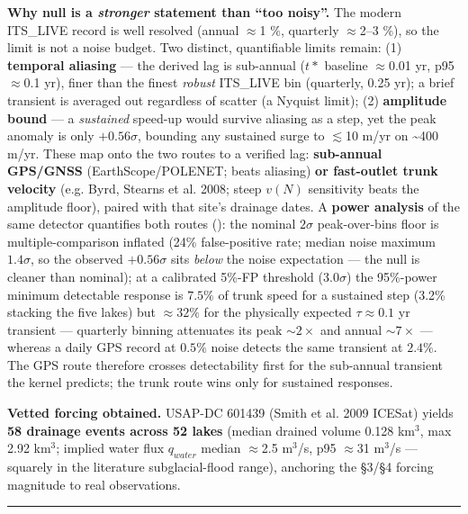 \documentclass[11pt]{article}
\begin{document}
\textbf{Why null is a \emph{stronger} statement than ``too noisy''.} The modern ITS\_LIVE record is well resolved (annual \ensuremath{\approx}1 \%, quarterly \ensuremath{\approx}2–3 \%), so the limit is not a noise budget. Two distinct, quantifiable limits remain: (1) \textbf{temporal aliasing} — the derived lag is sub-annual ($t*$ baseline \ensuremath{\approx}0.01 yr, p95 \ensuremath{\approx}0.1 yr), finer than the finest \emph{robust} ITS\_LIVE bin (quarterly, 0.25 yr); a brief transient is averaged out regardless of scatter (a Nyquist limit); (2) \textbf{amplitude bound} — a \emph{sustained} speed-up would survive aliasing as a step, yet the peak anomaly is only $+0.56\sigma $, bounding any sustained surge to \ensuremath{\lesssim}10 m/yr on \textasciitilde{}400 m/yr. These map onto the two routes to a verified lag: \textbf{sub-annual GPS/GNSS} (EarthScope/POLENET; beats aliasing) \textbf{or fast-outlet trunk velocity} (e.g. Byrd, Stearns et al. 2008; steep $v(N)$ sensitivity beats the amplitude floor), paired with that site's drainage dates. A \textbf{power analysis} of the same detector quantifies both routes (): the nominal $2\sigma $ peak-over-bins floor is multiple-comparison inflated (24\% false-positive rate; median noise maximum $1.4\sigma $, so the observed $+0.56\sigma $ sits \emph{below} the noise expectation — the null is cleaner than nominal); at a calibrated 5\%-FP threshold ($3.0\sigma $) the 95\%-power minimum detectable response is $7.5\%$ of trunk speed for a sustained step (3.2\% stacking the five lakes) but $\approx 32\%$ for the physically expected $\tau \approx 0.1$ yr transient — quarterly binning attenuates its peak $\sim 2\times $ and annual $\sim 7\times $ — whereas a daily GPS record at $0.5\%$ noise detects the same transient at $2.4\%$. The GPS route therefore crosses detectability first for the sub-annual transient the kernel predicts; the trunk route wins only for sustained responses.


\textbf{Vetted forcing obtained.} USAP-DC 601439 (Smith et al. 2009 ICESat) yields \textbf{58 drainage events across 52 lakes} (median drained volume 0.128 km\ensuremath{^{3}}, max 2.92 km\ensuremath{^{3}}; implied water flux $q_{water}$ median \ensuremath{\approx}2.5 m\ensuremath{^{3}}/s, p95 \ensuremath{\approx}31 m\ensuremath{^{3}}/s — squarely in the literature subglacial-flood range), anchoring the §3/§4 forcing magnitude to real observations.


\medskip\hrule\medskip
\end{document}
